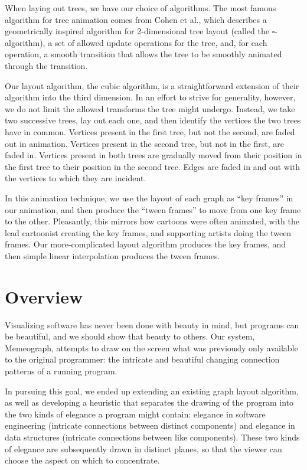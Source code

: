 \documentclass[11pt]{article}
\begin{document}
When laying out trees, we have our choice of algorithms.  The most famous
algorithm for tree animation comes from Cohen et al.\cite{tamassia}, which
describes a geometrically inspired algorithm for 2-dimensional tree layout
(called the $\square$-algorithm), a set of allowed update operations for the
tree, and, for each operation, a smooth transition that allows the tree to be
smoothly animated through the transition.

Our layout algorithm, the cubic algorithm, is a straightforward extension of
their algorithm into the third dimension.  In an effort to strive for
generality, however, we do not limit the allowed transforms the tree might
undergo.  Instead, we take two successive trees, lay out each one, and then
identify the vertices the two trees have in common.  Vertices present in the
first tree, but not the second, are faded out in animation.  Vertices present
in the second tree, but not in the first, are faded in.  Vertices present in
both trees are gradually moved from their position in the first tree to their
position in the second tree.  Edges are faded in and out with the vertices to
which they are incident.

In this animation technique, we use the layout of each graph as ``key frames''
in our animation, and then produce the ``tween frames'' to move from one key
frame to the other.  Pleasantly, this mirrors how cartoons were often animated,
with the lead cartoonist creating the key frames, and supporting artists doing
the tween frames.  Our more-complicated layout algorithm produces the key
frames, and then simple linear interpolation produces the tween frames.


\section{Overview}

Visualizing software has never been done with beauty in mind, but programs can
be beautiful, and we should show that beauty to others.  Our system,
Memeograph\nocite{memeograph}, attempts to draw on the screen what was
previously only available to the original programmer: the intricate and
beautiful changing connection patterns of a running program.

In pursuing this goal, we ended up extending an existing graph layout
algorithm, as well as developing a heuristic that separates the drawing of the
program into the two kinds of elegance a program might contain: elegance in
software engineering (intricate connections between distinct components) and
elegance in data structures (intricate connections between like components).
These two kinds of elegance are subsequently drawn in distinct planes, so that
the viewer can choose the aspect on which to concentrate.
\end{document}
